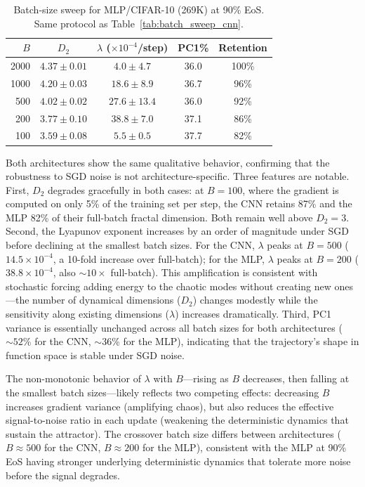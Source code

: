 \documentclass[aps,prl,twocolumn,superscriptaddress,floatfix]{revtex4-2}
\begin{document}
\begin{table}[h]
\caption{\label{tab:batch_sweep_mlp}%
Batch-size sweep for MLP/CIFAR-10 (269K) at 90\% EoS. Same protocol as Table~\ref{tab:batch_sweep_cnn}.}
\begin{ruledtabular}
\begin{tabular}{rcccc}
$B$ & $D_2$ & $\lambda$ ($\times 10^{-4}$/step) & PC1\% & Retention\\
\hline
2000 & $4.37 \pm 0.01$ & $4.0 \pm 4.7$ & 36.0 & 100\%\\
1000 & $4.20 \pm 0.03$ & $18.6 \pm 8.9$ & 36.7 & 96\%\\
500 & $4.02 \pm 0.02$ & $27.6 \pm 13.4$ & 36.0 & 92\%\\
200 & $3.77 \pm 0.10$ & $38.8 \pm 7.0$ & 37.1 & 86\%\\
100 & $3.59 \pm 0.08$ & $5.5 \pm 0.5$ & 37.7 & 82\%\\
\end{tabular}
\end{ruledtabular}
\end{table}

Both architectures show the same qualitative behavior, confirming that the robustness to SGD noise is not architecture-specific. Three features are notable. First, $D_2$ degrades gracefully in both cases: at $B = 100$, where the gradient is computed on only 5\% of the training set per step, the CNN retains 87\% and the MLP 82\% of their full-batch fractal dimension. Both remain well above $D_2 = 3$. Second, the Lyapunov exponent increases by an order of magnitude under SGD before declining at the smallest batch sizes. For the CNN, $\lambda$ peaks at $B = 500$ ($14.5 \times 10^{-4}$, a 10-fold increase over full-batch); for the MLP, $\lambda$ peaks at $B = 200$ ($38.8 \times 10^{-4}$, also ${\sim}10\times$ full-batch). This amplification is consistent with stochastic forcing adding energy to the chaotic modes without creating new ones---the number of dynamical dimensions ($D_2$) changes modestly while the sensitivity along existing dimensions ($\lambda$) increases dramatically. Third, PC1 variance is essentially unchanged across all batch sizes for both architectures (${\sim}52$\% for the CNN, ${\sim}36$\% for the MLP), indicating that the trajectory's shape in function space is stable under SGD noise.

The non-monotonic behavior of $\lambda$ with $B$---rising as $B$ decreases, then falling at the smallest batch sizes---likely reflects two competing effects: decreasing $B$ increases gradient variance (amplifying chaos), but also reduces the effective signal-to-noise ratio in each update (weakening the deterministic dynamics that sustain the attractor). The crossover batch size differs between architectures ($B \approx 500$ for the CNN, $B \approx 200$ for the MLP), consistent with the MLP at 90\% EoS having stronger underlying deterministic dynamics that tolerate more noise before the signal degrades.
\end{document}
